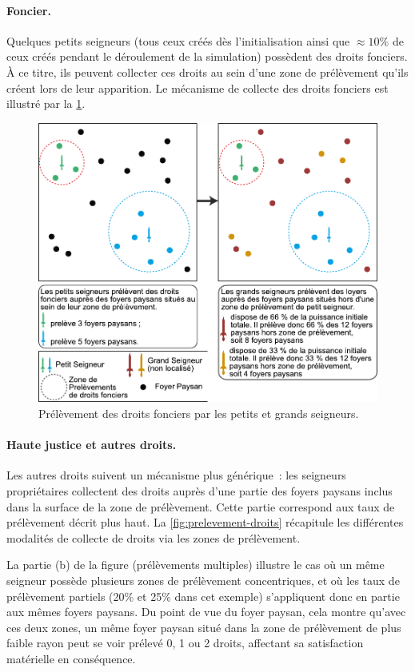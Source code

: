 \paragraph{Foncier.}

Quelques petits seigneurs (tous ceux créés dès l'initialisation ainsi que $\approx 10\%$ de ceux créés pendant le déroulement de la simulation) possèdent des droits fonciers.
À ce titre, ils peuvent collecter ces droits au sein d'une zone de prélèvement qu'ils créent lors de leur apparition.
Le mécanisme de collecte des droits fonciers est illustré par la \cref{fig:prelevement-fonciers}.
\begin{figure}[H]
	\centering
	\includegraphics[width=0.8\linewidth]{img/prelevements_foncier.pdf}
	\caption{Prélèvement des droits fonciers par les petits et grands seigneurs.}
	\label{fig:prelevement-fonciers}
\end{figure}

\paragraph{Haute justice et autres droits.}

Les autres droits suivent un mécanisme plus générique : les seigneurs propriétaires collectent des droits auprès d'une partie des foyers paysans inclus dans la surface de la zone de prélèvement.
Cette partie correspond aux \og taux de prélèvement\fg{} décrit plus haut. La \cref{fig:prelevement-droits} récapitule les différentes modalités de collecte de droits via les zones de prélèvement.

La partie (b) de la figure (prélèvements multiples) illustre le cas où un même seigneur possède plusieurs zones de prélèvement concentriques, et où les taux de prélèvement partiels (20\% et 25\% dans cet exemple) s'appliquent donc en partie aux mêmes foyers paysans.
Du point de vue du foyer paysan, cela montre qu'avec ces deux zones, un même foyer paysan situé dans la zone de prélèvement de plus faible rayon peut se voir prélevé 0, 1 ou 2 droits, affectant sa satisfaction matérielle en conséquence.


